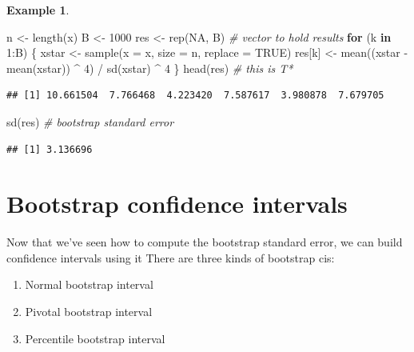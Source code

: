 \documentclass[
]{book}
\newenvironment{Shaded}{\begin{snugshade}}{\end{snugshade}}
\newcommand{\AttributeTok}[1]{\textcolor[rgb]{0.77,0.63,0.00}{#1}}
\newcommand{\CommentTok}[1]{\textcolor[rgb]{0.56,0.35,0.01}{\textit{#1}}}
\newcommand{\ConstantTok}[1]{\textcolor[rgb]{0.00,0.00,0.00}{#1}}
\newcommand{\ControlFlowTok}[1]{\textcolor[rgb]{0.13,0.29,0.53}{\textbf{#1}}}
\newcommand{\DecValTok}[1]{\textcolor[rgb]{0.00,0.00,0.81}{#1}}
\newcommand{\FunctionTok}[1]{\textcolor[rgb]{0.00,0.00,0.00}{#1}}
\newcommand{\NormalTok}[1]{#1}
\newcommand{\OtherTok}[1]{\textcolor[rgb]{0.56,0.35,0.01}{#1}}
\newcommand{\SpecialCharTok}[1]{\textcolor[rgb]{0.00,0.00,0.00}{#1}}
\providecommand{\tightlist}{%
  \setlength{\itemsep}{0pt}\setlength{\parskip}{0pt}}
\theoremstyle{definition}
\theoremstyle{definition}
\newtheorem{example}{Example}[chapter]
\theoremstyle{definition}
\theoremstyle{definition}
\theoremstyle{remark}
\begin{document}
\begin{example}
\begin{Shaded}
\begin{Highlighting}[]
\NormalTok{n }\OtherTok{\textless{}{-}} \FunctionTok{length}\NormalTok{(x)}
\NormalTok{B }\OtherTok{\textless{}{-}} \DecValTok{1000}
\NormalTok{res }\OtherTok{\textless{}{-}} \FunctionTok{rep}\NormalTok{(}\ConstantTok{NA}\NormalTok{, B)  }\CommentTok{\# vector to hold results}
\ControlFlowTok{for}\NormalTok{ (k }\ControlFlowTok{in} \DecValTok{1}\SpecialCharTok{:}\NormalTok{B) \{}
\NormalTok{  xstar }\OtherTok{\textless{}{-}} \FunctionTok{sample}\NormalTok{(}\AttributeTok{x =}\NormalTok{ x, }\AttributeTok{size =}\NormalTok{ n, }\AttributeTok{replace =} \ConstantTok{TRUE}\NormalTok{)}
\NormalTok{  res[k] }\OtherTok{\textless{}{-}} \FunctionTok{mean}\NormalTok{((xstar }\SpecialCharTok{{-}} \FunctionTok{mean}\NormalTok{(xstar)) }\SpecialCharTok{\^{}} \DecValTok{4}\NormalTok{) }\SpecialCharTok{/} \FunctionTok{sd}\NormalTok{(xstar) }\SpecialCharTok{\^{}} \DecValTok{4}
\NormalTok{\}}
\FunctionTok{head}\NormalTok{(res)  }\CommentTok{\# this is T*}
\end{Highlighting}
\end{Shaded}

\begin{verbatim}
## [1] 10.661504  7.766468  4.223420  7.587617  3.980878  7.679705
\end{verbatim}

\begin{Shaded}
\begin{Highlighting}[]
\FunctionTok{sd}\NormalTok{(res)  }\CommentTok{\# bootstrap standard error}
\end{Highlighting}
\end{Shaded}

\begin{verbatim}
## [1] 3.136696
\end{verbatim}

\end{example}

\hypertarget{bootstrap-confidence-intervals}{%
\section{Bootstrap confidence intervals}\label{bootstrap-confidence-intervals}}

Now that we've seen how to compute the bootstrap standard error, we can build confidence intervals using it There are three kinds of bootstrap cis:

\begin{enumerate}
\def\labelenumi{\arabic{enumi}.}
\tightlist
\item
  Normal bootstrap interval
\item
  Pivotal bootstrap interval
\item
  Percentile bootstrap interval
\end{enumerate}
\end{document}
